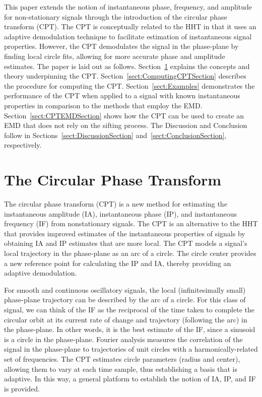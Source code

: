 \documentclass[11pt,draftcls,onecolumn]{IEEEtran}
\begin{document}
This paper extends the notion of instantaneous phase, frequency, and amplitude for non-stationary signals through the introduction of the circular phase transform (CPT). The CPT is conceptually related to the HHT in that it uses an adaptive demodulation technique to facilitate estimation of instantaneous signal properties. However, the CPT demodulates the signal in the phase-plane by finding local circle fits, allowing for more accurate phase and amplitude estimates. The paper is laid out as follows. Section~\ref{sect:CPTDescriptionSection} explains the concepts and theory underpinning the CPT. Section~\ref{sect:ComputingCPTSection} describes the procedure for computing the CPT. Section~\ref{sect:Examples} demonstrates the performance of the CPT when applied to a signal with known instantaneous properties in comparison to the methods that employ the EMD. Section~\ref{sect:CPTEMDSection} shows how the CPT can be used to create an EMD that does not rely on the sifting process. %
The Discussion and Conclusion follow in Sections~\ref{sect:DiscussionSection} and~\ref{sect:ConclusionSection}, respectively. 

\section{The Circular Phase Transform}\label{sect:CPTDescriptionSection}
The circular phase transform (CPT) is a new method for estimating the instantaneous amplitude (IA), instantaneous phase (IP), and instantaneous frequency (IF) from nonstationary signals. The CPT is an alternative to the HHT that provides improved estimates of the instantaneous properties of signals by obtaining IA and IP estimates that are more local. The CPT models a signal's local trajectory in the phase-plane as an arc of a circle. The circle center provides a new reference point for calculating the IP and IA, thereby providing an adaptive demodulation.

For smooth and continuous oscillatory signals, the local (infinitesimally small) phase-plane trajectory can be described by the arc of a circle. For this class of signal, we can think of the IF as the reciprocal of the time taken to complete the circular orbit at its current rate of change and trajectory (following the arc) in the phase-plane. In other words, it is the best estimate of the IF, since a sinusoid is a circle in the phase-plane. Fourier analysis measures the correlation of the signal in the phase-plane to trajectories of unit circles with a harmonically-related set of frequencies. The CPT estimates circle parameters (radius and center), allowing them to vary at each time sample, thus establishing a basis that is adaptive. In this way, a general platform to establish the notion of IA, IP, and IF is provided.
\end{document}
